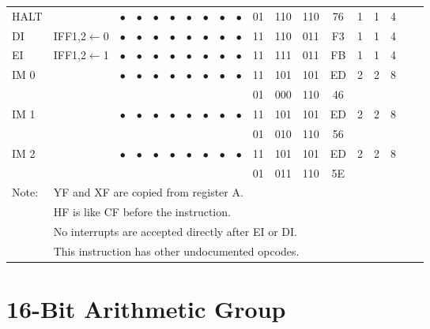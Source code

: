 \documentclass[oneside,a4paper]{book}
\begin{document}
{\begin{tabular}{llc@{ }c@{ }c@{ }c@{ }c@{ }c@{ }c@{ }cc@{ }c@{ }cccccll}
HALT & & 
	$\bullet$ & $\bullet$ & $\bullet$ & $\bullet$ & $\bullet$ & $\bullet$ & $\bullet$ & $\bullet$ & 01 & 110 & 110
	& 76 & 1 & 1 & 4 & & \\

DI\footnotemark[3] & IFF1,2$\leftarrow$0 & 
	$\bullet$ & $\bullet$ & $\bullet$ & $\bullet$ & $\bullet$ & $\bullet$ & $\bullet$ & $\bullet$ & 11 & 110 & 011
	& F3 & 1 & 1 & 4 & & \\

EI\footnotemark[3] & IFF1,2$\leftarrow$1 & 
	$\bullet$ & $\bullet$ & $\bullet$ & $\bullet$ & $\bullet$ & $\bullet$ & $\bullet$ & $\bullet$ & 11 & 111 & 011
	& FB & 1 & 1 & 4 & & \\

IM 0\footnotemark[4] & & 
	$\bullet$ & $\bullet$ & $\bullet$ & $\bullet$ & $\bullet$ & $\bullet$ & $\bullet$ & $\bullet$ & 11 & 101 & 101
	& ED & 2 & 2 & 8 & & \\
\multicolumn{10}{c}{} & 01 & 000 & 110 & 46 & \multicolumn{3}{c}{} & & \\ 

IM 1\footnotemark[4] & & 
	$\bullet$ & $\bullet$ & $\bullet$ & $\bullet$ & $\bullet$ & $\bullet$ & $\bullet$ & $\bullet$ & 11 & 101 & 101
	& ED & 2 & 2 & 8 & & \\
\multicolumn{10}{c}{} & 01 & 010 & 110 & 56 & \multicolumn{3}{c}{} & & \\ 

IM 2\footnotemark[4] & & 
	$\bullet$ & $\bullet$ & $\bullet$ & $\bullet$ & $\bullet$ & $\bullet$ & $\bullet$ & $\bullet$ & 11 & 101 & 101
	& ED & 2 & 2 & 8 & & \\
\multicolumn{10}{c}{} & 01 & 011 & 110 & 5E & \multicolumn{3}{c}{} & & \\ \hline

Note: & \multicolumn{18}{l}{\parbox{12cm}{\footnotemark[1]YF and XF are copied from register A.}} \\
      & \multicolumn{18}{l}{\parbox{12cm}{\footnotemark[2]HF is like CF before the instruction.}} \\
      & \multicolumn{18}{l}{\parbox{12cm}{\footnotemark[3]No interrupts are accepted directly after EI or DI.}} \\
      & \multicolumn{18}{l}{\parbox{12cm}{\footnotemark[4]This instruction has other undocumented opcodes.}} \\ \hline

\end{tabular}
}

\section{16-Bit Arithmetic Group}
\end{document}

